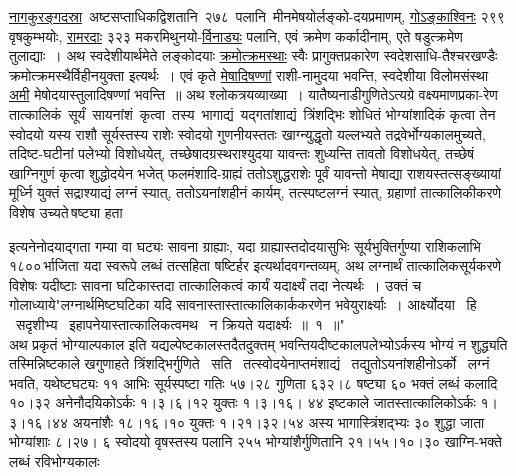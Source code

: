 \documentclass[11pt, openany]{book}
\begin{document}
\hyperref[3.1]{नागकुरङ्गदस्रा} \,अष्टसप्ताधिकद्विशतानि \,२७८ \,पलानि \,मीनमेषयोर्लङ्को-दयप्रमाणम्, \hyperref[3.1]{गोऽङ्काश्विनः} २९९ वृषकुम्भयोः, \hyperref[3.1]{रामरदाः} ३२३ मकरमिथुनयो-\hyperref[3.1]{र्विनाड्यः} पलानि, एवं क्रमेण कर्कादीनाम्, एते षडुत्क्रमेण तुलाद्याः~। अथ स्वदेशीयार्थमेते लङ्कोदयाः \hyperref[3.1]{क्रमोत्क्रमस्थाः} स्वैः प्रागुक्तप्रकारेण स्वदेशसाधि-तैश्चरखण्डैः क्रमोत्क्रमस्थैर्विहीनयुक्ता इत्यर्थः~। एवं कृते \hyperref[3.2]{मेषादिषण्णां} राशी-नामुदया \;भवन्ति, \;स्वदेशीया \;विलोमसंस्था \;\hyperref[3.2]{अमी} \;मेषोदयास्तुलादिषण्णां भवन्ति~॥ अथ श्लोकत्रयव्याख्या~। यातैष्यनाडीगुणितेऽत्यग्रे वक्ष्यमाणप्रका-रेण \,तात्कालिकं \,सूर्यं \,सायनांशं \,कृत्वा \,तस्य \,भागाद्यं \,यद्गतांशाद्यं \,त्रिंशद्भिः शोधितं \;भोग्यांशादिकं \;कृत्वा \;तेन \;स्वोदयो \;यस्य \;राशौ \;सूर्यस्तस्य \;राशेः स्वोदयो गुणनीयस्ततः खाग्न्युद्धृतो यल्लभ्यते तद्रवेर्भोग्यकालमुच्यते, तदिष्ट-घटीनां \;पलेभ्यो \;विशोधयेत्, \;तच्छेषादग्रस्थराश्युदया \;यावन्तः \;शुध्यन्ति तावतो विशोधयेत्, तच्छेषं खाग्निगुणं कृत्वा शुद्धोदयेन भजेत् फलमंशादि-ग्राह्यं \;ततोऽशुद्धराशेः \;पूर्वं \;यावन्तो \;मेषाद्या \;राशयस्तत्सङ्ख्यायां \;मूर्ध्नि \;युक्तं सद्राश्याद्यं लग्नं स्यात्, ततोऽयनांशहीनं कार्यम्, तत्स्पष्टलग्नं स्यात्, ग्रहाणां तात्कालिकीकरणे विशेष उच्यते\textendash \,षष्ट्या हता

\newpage

\noindent इत्यनेनोदयाद्गता गम्या वा घट्यः सावना ग्राह्याः, यदा ग्राह्यास्तदोदयासुभिः सूर्यभुक्तिर्गुण्या राशिकलाभि\textendash \,१८००\textendash \,र्भाजिता यदा स्वरूपे लब्धं तत्सहिता षष्टिर्हर \;इत्यर्थादवगन्तव्यम्, \;अथ \;लग्नार्थं \;तात्कालिकसूर्यकरणे \;विशेषः यदीष्टाः सावना घटिकास्तदा तात्कालिकत्वं कार्यं यदार्क्ष्यं तदा नेत्यर्थः~। उक्तं च {\color{violet}गोलाध्याये\textendash "लग्नार्थमिष्टघटिका यदि सावनास्तास्तात्कालिकार्ककरणेन भवेयुरार्क्ष्याः~। आर्क्ष्योदया ~हि ~सदृशीभ्य ~इहापनेयास्तात्कालिकत्वमथ ~न क्रियते यदार्क्ष्यः~॥~१~॥"}\\

अथ \;प्रकृतं \;भोग्याल्पकाल \;इति \;यद्यल्पेष्टकालस्तदैतदुक्तम् \;भवन्ति\textendash \;यदीष्टकालपलेभ्योऽर्कस्य \;भोग्यं \;न \;शुद्ध्यति \;तस्मिन्निष्टकाले \;खगुणाहते त्रिंशद्भिर्गुणिते ~सति ~तत्स्वोदयेनाप्तमंशाद्यं ~तद्युतोऽयनांशहीनोऽर्को ~लग्नं भवति, यथेष्टघट्यः ११ आभिः सूर्यस्पष्टा गतिः ५७।२८ गुणिता ६३२।८ षष्ट्या ६० भक्तं लब्धं कलादि १०।३२ अनेनौदयिकोऽर्कः १।३।६।१२ युक्तः १।३।१६। ४४ \;इष्टकाले \;जातस्तात्कालिकोऽर्कः \;१।३।१६।४४ \;अयनांशैः \;१८।१६।१० युक्तः १।२१।३२।५४ अस्य भागास्त्रिंशद्भ्यः ३० शुद्धा जाता भोग्यांशाः ८।२७। ६ स्वोदयो वृषस्तस्य पलानि २५५ भोग्यांशैर्गुणितानि २१।५५।१०।३० खाग्नि-भक्ते लब्धं रविभोग्यकालः
\end{document}
